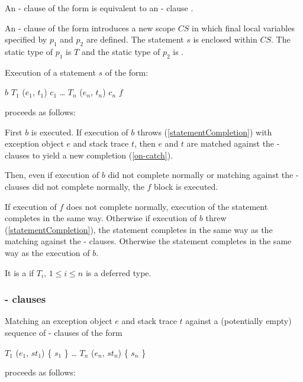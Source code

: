 \documentclass[makeidx]{article}
\begin{document}
{An \ON{}-\CATCH{} clause of the form
is equivalent to an \ON{}-\CATCH{} clause
.

\LMHash{}%
An \ON{}-\CATCH{} clause of the form
introduces a new scope $CS$ in which final local variables
specified by $p_1$ and $p_2$ are defined.
The statement $s$ is enclosed within $CS$.
The static type of $p_1$ is $T$
and the static type of $p_2$ is .

\LMHash{}%
Execution of a \TRY{} statement $s$ of the form:

\begin{normativeDartCode}
\TRY{} $b$
\ON{} $T_1$ \CATCH{} ($e_1$, $t_1$) $c_1$
\ldots{}
\ON{} $T_n$ \CATCH{} ($e_n$, $t_n$) $c_n$
\FINALLY{} $f$
\end{normativeDartCode}
proceeds as follows:

\LMHash{}%
First $b$ is executed.
If execution of $b$ throws (\ref{statementCompletion})
with exception object $e$ and stack trace $t$,
then $e$ and $t$ are matched against the \ON{}-\CATCH{} clauses
to yield a new completion (\ref{on-catch}).

Then, even if execution of $b$ did not complete normally
or matching against the \ON{}-\CATCH{} clauses did not complete normally,
the $f$ block is executed.

If execution of $f$ does not complete normally,
execution of the \TRY{} statement completes in the same way.
Otherwise if execution of $b$ threw (\ref{statementCompletion}),
the \TRY{} statement completes in the same way as
the matching against the \ON{}-\CATCH{} clauses.
Otherwise the \TRY{} statement completes in the same way as
the execution of $b$.

\LMHash{}%
It is a  if $T_i$, $1 \le i \le n$ is a deferred type.


\subsubsection{\ON{}-\CATCH{} clauses}

\LMHash{}%
Matching an exception object $e$ and stack trace $t$ against
a (potentially empty) sequence of \ON{}-\CATCH{} clauses of the form

\begin{normativeDartCode}
\ON{} $T_1$ \CATCH{} ($e_1$, $st_1$) \{ $s_1$ \}
\ldots
\ON{} $T_n$ \CATCH{} ($e_n$, $st_n$) \{ $s_n$ \}
\end{normativeDartCode}
proceeds as follows:

}
\end{document}
